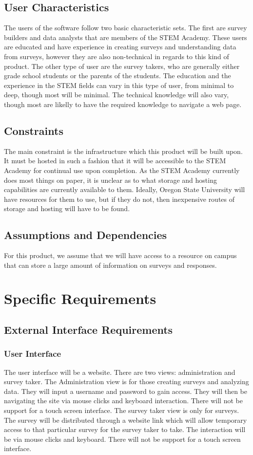 \subsection{User Characteristics}
The users of the software follow two basic characteristic sets. The first are survey builders and data analysts that are members of the
STEM Academy. These users are educated and have experience in creating surveys and understanding data from surveys,
however they are also non-technical in regards to this kind of product. The other type of user are the survey takers, who are
generally either grade school students or the parents of the students. The education and the experience in the STEM fields
can vary in this type of user, from minimal to deep, though most will be minimal. The technical knowledge will also vary, though
most are likelly to have the required knowledge to navigate a web page.
\subsection{Constraints}
The main constraint is the infrastructure which this product will be built upon. It must be hosted in such a fashion that it will
be accessible to the STEM Academy for continual use upon completion. As the STEM Academy currently does most things on
paper, it is unclear as to what storage and hosting capabilities are currently available to them. Ideally, Oregon State University
will have resources for them to use, but if they do not, then inexpensive routes of storage and hosting will have to be found. 
\subsection{Assumptions and Dependencies}
For this product, we assume that we will have access to a resource on campus that can store a large amount of information on
surveys and responses. 
\section{Specific Requirements}

\subsection{External Interface Requirements}

\subsubsection{User Interface}
The user interface will be a website. There are two views: administration and survey taker. 
The Administration view is for those creating surveys and analyzing data. They will input a 
username and password to gain access. They will then be navigating the site via mouse clicks 
and keyboard interaction. There will not be support for a touch screen interface. The survey
taker view is only for surveys. The survey will be distributed through a website link which 
will allow temporary access to that particular survey for the survey taker to take. The 
interaction will be via mouse clicks and keyboard. There will not be support for a touch screen
interface.

